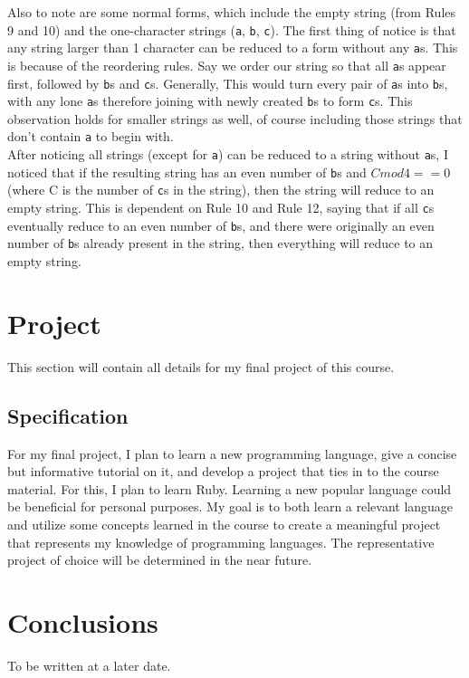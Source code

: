 \documentclass{article}
\theoremstyle{theorem}
\theoremstyle{definition}
\theoremstyle{remark}
\begin{document}
\noindent Also to note are some normal forms, which include the empty string (from Rules 9 and 10) and the one-character strings (\texttt{a}, \texttt{b}, \texttt{c}). The first thing of notice is that any string larger than 1 character can be reduced to a form without any \texttt{a}s. This is because of the reordering rules. Say we order our string so that all \texttt{a}s appear first, followed by \texttt{b}s and \texttt{c}s. Generally, This would turn every pair of \texttt{a}s into \texttt{b}s, with any lone \texttt{a}s therefore joining with newly created \texttt{b}s to form \texttt{c}s. This observation holds for smaller strings as well, of course including those strings that don't contain \texttt{a} to begin with.\\

\noindent After noticing all strings (except for \texttt{a}) can be reduced to a string without \texttt{a}s, I noticed that if the resulting string has an even number of \texttt{b}s and $C mod 4 == 0$ (where C is the number of \texttt{c}s in the string), then the string will reduce to an empty string. This is dependent on Rule 10 and Rule 12, saying that if all \texttt{c}s eventually reduce to an even number of \texttt{b}s, and there were originally an even number of \texttt{b}s already present in the string, then everything will reduce to an empty string.

\section{Project}
This section will contain all details for my final project of this course.
\subsection{Specification}
For my final project, I plan to learn a new programming language, give a concise but informative tutorial on it, and develop a project that ties in to the course material. For this, I plan to learn Ruby. Learning a new popular language could be beneficial for personal purposes. My goal is to both learn a relevant language and utilize some concepts learned in the course to create a meaningful project that represents my knowledge of programming languages. The representative project of choice will be determined in the near future.


\section{Conclusions}\label{conclusions}

To be written at a later date.
\end{document}
